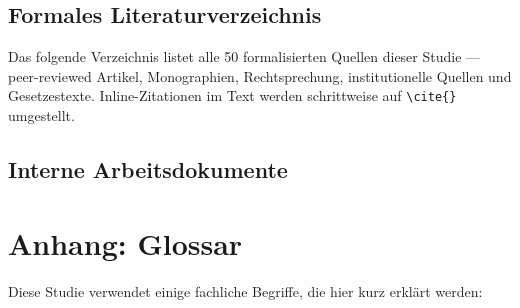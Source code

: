 \documentclass{umbruch-position}
\begin{document}
\subsection*{Formales Literaturverzeichnis}

Das folgende Verzeichnis listet alle 50 formalisierten Quellen dieser Studie --- peer-reviewed Artikel, Monographien, Rechtsprechung, institutionelle Quellen und Gesetzestexte. Inline-Zitationen im Text werden schrittweise auf \texttt{\textbackslash cite\{\}} umgestellt.

\nocite{*}



\subsection*{Interne Arbeitsdokumente}


\section*{Anhang: Glossar}

Diese Studie verwendet einige fachliche Begriffe, die hier kurz erklärt werden:
\end{document}
